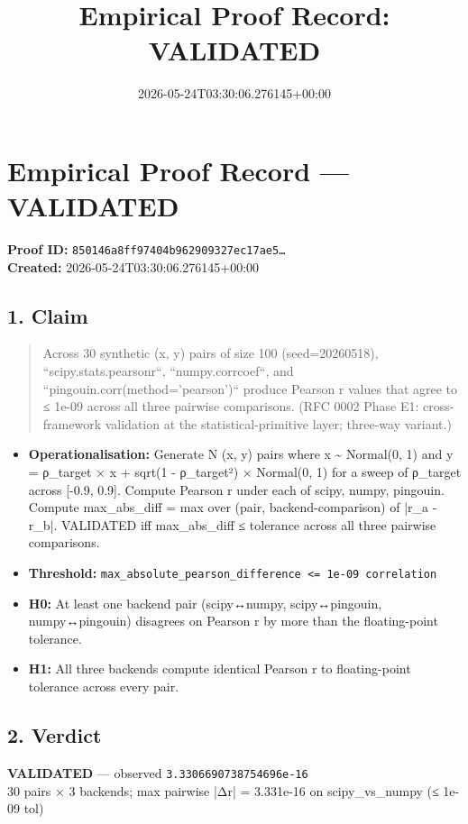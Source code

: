 \documentclass{article}
\title{Empirical Proof Record: VALIDATED}
\date{2026-05-24T03:30:06.276145+00:00}
\begin{document}
\maketitle
\section*{Empirical Proof Record --- \textcolor{validated}{\textbf{VALIDATED}}}
\textbf{Proof ID:} \texttt{850146a8ff97404b962909327ec17ae5\dots}\\
\textbf{Created:} 2026-05-24T03:30:06.276145+00:00
\subsection*{1. Claim}
\begin{quote}Across 30 synthetic (x, y) pairs of size 100 (seed=20260518), ``scipy.stats.pearsonr``, ``numpy.corrcoef``, and ``pingouin.corr(method='pearson')`` produce Pearson r values that agree to ≤ 1e-09 across all three pairwise comparisons. (RFC 0002 Phase E1: cross-framework validation at the statistical-primitive layer; three-way variant.)\end{quote}
\begin{itemize}
\item \textbf{Operationalisation:} Generate N (x, y) pairs where x \textasciitilde{} Normal(0, 1) and y = ρ\_target × x + sqrt(1 - ρ\_target²) × Normal(0, 1) for a sweep of ρ\_target across [-0.9, 0.9]. Compute Pearson r under each of scipy, numpy, pingouin. Compute max\_abs\_diff = max over (pair, backend-comparison) of |r\_a - r\_b|. VALIDATED iff max\_abs\_diff ≤ tolerance across all three pairwise comparisons.
\item \textbf{Threshold:} \texttt{max\_absolute\_pearson\_difference <= 1e-09 correlation}
\item \textbf{H0:} At least one backend pair (scipy↔numpy, scipy↔pingouin, numpy↔pingouin) disagrees on Pearson r by more than the floating-point tolerance.
\item \textbf{H1:} All three backends compute identical Pearson r to floating-point tolerance across every pair.
\end{itemize}
\subsection*{2. Verdict}
\textcolor{validated}{\textbf{VALIDATED}} --- observed \texttt{3.3306690738754696e-16}\\
30 pairs × 3 backends; max pairwise |Δr| = 3.331e-16 on scipy\_vs\_numpy (≤ 1e-09 tol)
\end{document}
